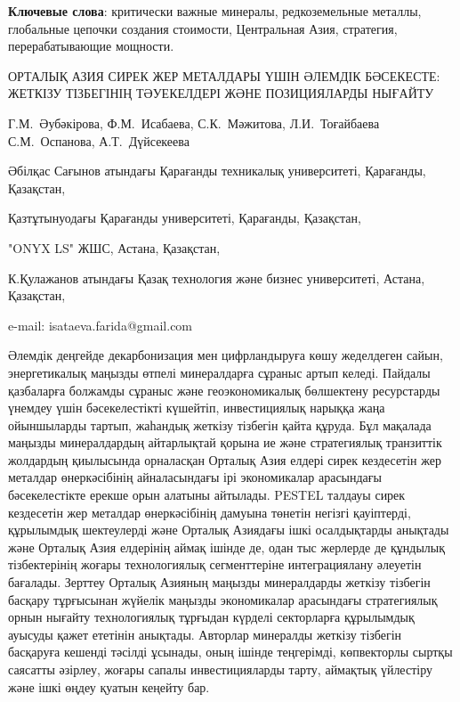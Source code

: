 {\bfseries Ключевые слова}: критически важные минералы, редкоземельные
металлы, глобальные цепочки создания стоимости, Центральная Азия,
стратегия, перерабатывающие мощности.

\begin{header}
ОРТАЛЫҚ АЗИЯ СИРЕК ЖЕР МЕТАЛДАРЫ ҮШІН ӘЛЕМДІК БӘСЕКЕСТЕ: ЖЕТКІЗУ ТІЗБЕГІНІҢ ТӘУЕКЕЛДЕРІ ЖӘНЕ ПОЗИЦИЯЛАРДЫ НЫҒАЙТУ

Г.М.~Әубәкірова,
Ф.М.~Исабаева\envelope,
С.К.~Мәжитова,
Л.И.~Тоғайбаева
С.М.~Оспанова,
А.Т.~Дүйсекеева
\end{header}

\begin{affil}
Әбілқас Сағынов атындағы Қарағанды техникалық университеті, Қарағанды, Қазақстан,

Қазтұтынуодағы Қарағанды университеті, Қарағанды, Қазақстан,

"ONYX LS" ЖШС, Астана, Қазақстан,

К.Қулажанов атындағы Қазақ технология және бизнес университеті, Астана, Қазақстан,

e-mail: isataeva.farida@gmail.com
\end{affil}

Әлемдік деңгейде декарбонизация мен цифрландыруға көшу жеделдеген сайын,
энергетикалық маңызды өтпелі минералдарға сұраныс артып келеді. Пайдалы
қазбаларға болжамды сұраныс және геоэкономикалық бөлшектену ресурстарды
үнемдеу үшін бәсекелестікті күшейтіп, инвестициялық нарыққа жаңа
ойыншыларды тартып, жаһандық жеткізу тізбегін қайта құруда. Бұл мақалада
маңызды минералдардың айтарлықтай қорына ие және стратегиялық транзиттік
жолдардың қиылысында орналасқан Орталық Азия елдері сирек кездесетін жер
металдар өнеркәсібінің айналасындағы ірі экономикалар арасындағы
бәсекелестікте ерекше орын алатыны айтылады. PESTEL талдауы сирек
кездесетін жер металдар өнеркәсібінің дамуына төнетін негізгі
қауіптерді, құрылымдық шектеулерді және Орталық Азиядағы ішкі
осалдықтарды анықтады және Орталық Азия елдерінің аймақ ішінде де, одан
тыс жерлерде де құндылық тізбектерінің жоғары технологиялық
сегменттеріне интеграциялану әлеуетін бағалады. Зерттеу Орталық Азияның
маңызды минералдарды жеткізу тізбегін басқару тұрғысынан жүйелік маңызды
экономикалар арасындағы стратегиялық орнын нығайту технологиялық
тұрғыдан күрделі секторларға құрылымдық ауысуды қажет ететінін анықтады.
Авторлар минералды жеткізу тізбегін басқаруға кешенді тәсілді ұсынады,
оның ішінде теңгерімді, көпвекторлы сыртқы саясатты әзірлеу, жоғары
сапалы инвестицияларды тарту, аймақтық үйлестіру және ішкі өңдеу қуатын
кеңейту бар.

